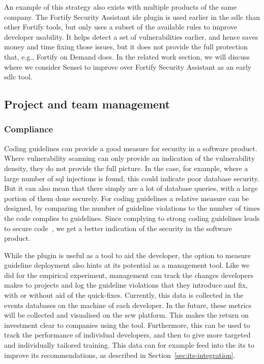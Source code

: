 An example of this strategy also exists with multiple products of the same company. 
The Fortify Security Assistant \gls{ide} plugin is used earlier in the \gls{sdlc} than other Fortify tools, but only uses a subset of the available rules to improve developer usability.
It helps detect a set of vulnerabilities earlier, and hence saves money and time fixing those issues, but it does not provide the full protection that, e.g., Fortify on Demand does.
In the related work section, we will discuss where we consider Sensei to improve over Fortify Security Assistant as an early \gls{sdlc} tool.

\subsection{Project and team management}
\subsubsection{Compliance}
Coding guidelines can provide a good measure for security in a software product.
Where vulnerability scanning can only provide an indication of the vulnerability density, they do not provide the full picture.
In the case, for example, where a large number of \gls{sql} injections is found, this could indicate poor database security.
But it can also mean that there simply are a lot of database queries, with a large portion of them done securely.
For coding guidelines a relative measure can be designed, by comparing the number of guideline violations to the number of times the code complies to guidelines. Since complying to strong coding guidelines leads to secure code~\cite{banerjee2009software,tabassum2017comparing}, we get a better indication of the security in the software product.

While the plugin is useful as a tool to aid the developer, the option to measure guideline deployment also hints at its potential as a management tool.
Like we did for the empirical experiment, management can track the changes developers makes to projects and log the guideline violations that they introduce and fix, with or without aid of the quick-fixes.
Currently, this data is collected in the events databases on the machine of each developer.
In the future, these metrics will be collected and visualised on the \gls{scw} platform.
This makes the return on investment clear to companies using the tool.
Furthermore, this can be used to track the performance of individual developers, and then to give more targeted and individually tailored training.
This data can for example feed into the \gls{its} to improve its recommendations, as described in Section~\ref{sec:its-integration}.

